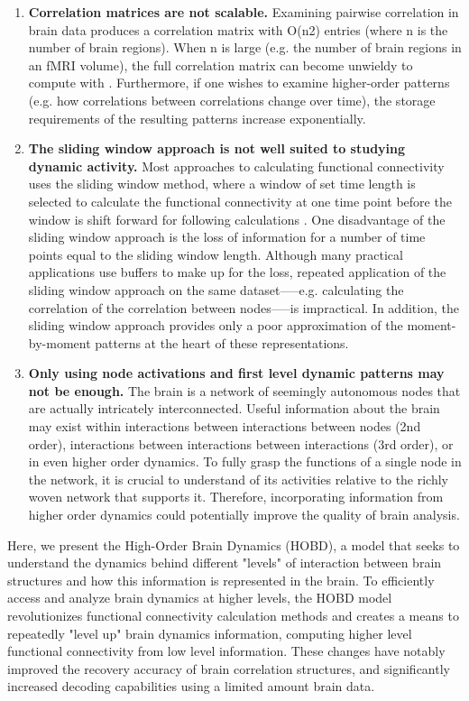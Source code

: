 \documentclass[12pt]{article}
\begin{document}
\begin{enumerate}
\item	\textbf{Correlation matrices are not scalable.} Examining pairwise correlation in brain data
produces a correlation matrix with O(n2) entries (where n is the number of brain regions). When n is large (e.g. the number of brain regions in an fMRI volume), the full correlation matrix can become unwieldy to compute with \cite{Rubinov2010}\cite{Betzel2017}\cite{Craddock2012}\cite{Yeo2011}. Furthermore, if one wishes to examine higher-order patterns (e.g. how correlations between correlations change over time), the storage requirements of the resulting patterns increase exponentially.

\item \textbf{The sliding window approach is not well suited to studying dynamic activity.} Most approaches to calculating functional connectivity uses the sliding window method, where a window of set time length is selected to calculate the functional connectivity at one time point before the window is shift forward for following calculations \cite{enrico2011}\cite{elena2012}. One disadvantage of the sliding window approach is the loss of information for a number of time points equal to the sliding window length. Although many practical applications use buffers to make up for the loss, repeated application of the sliding window approach on the same dataset—--e.g. calculating the correlation of the correlation between nodes—--is impractical. In addition, the sliding window approach provides only a poor approximation of the moment-by-moment patterns at the heart of these representations.

\item \textbf{Only using node activations and first level dynamic patterns may not be enough.} The brain is a network of seemingly autonomous nodes that are actually intricately interconnected. Useful information about the brain may exist within interactions between interactions between nodes (2nd order), interactions between interactions between interactions (3rd order), or in even higher order dynamics. To fully grasp the functions of a single node in the network, it is crucial to understand of its activities relative to the richly woven network that supports it. Therefore, incorporating information from higher order dynamics could potentially improve the quality of brain analysis.

\end{enumerate}

Here, we present the High-Order Brain Dynamics (HOBD), a model that seeks to understand the dynamics behind different "levels" of interaction between brain structures and how this information is represented in the brain. To efficiently access and analyze brain dynamics at higher levels, the HOBD model revolutionizes functional connectivity calculation methods and creates a means to repeatedly "level up" brain dynamics information, computing higher level functional connectivity from low level information. These changes have notably improved the recovery accuracy of brain correlation structures, and significantly increased decoding capabilities using a limited amount brain data.
\end{document}
